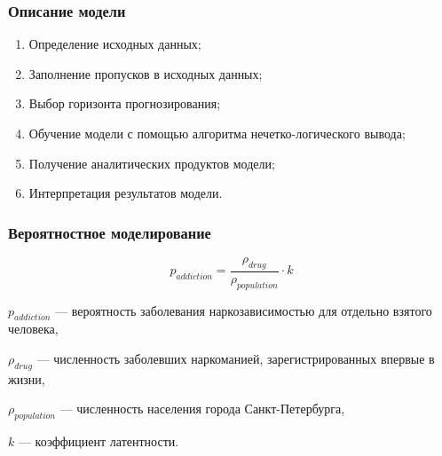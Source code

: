 \documentclass[t]{beamer}  %
\begin{document}
\begin{frame}
    \frametitle{Описание модели} 
    \begin{enumerate}
        \item Определение исходных данных;
        \item Заполнение пропусков в исходных данных;
        \item Выбор горизонта прогнозирования;
        \item Обучение модели с помощью алгоритма нечетко-логического вывода;
        \item Получение аналитических продуктов модели;
        \item Интерпретация результатов модели.
    \end{enumerate}
\end{frame}
\begin{frame}
    \frametitle{Вероятностное моделирование} 
    \begin{equation}
        p_{addiction} = \frac{\rho_{drug}}{\rho_{population}}\cdot k
    \end{equation}

    \(p_{addiction}\) --- вероятность заболевания наркозависимостью для
    отдельно взятого человека, 
    
    \(\rho_{drug}\) --- численность заболевших
    наркоманией, зарегистрированных впервые в жизни, 
    
    \(\rho_{population}\) ---
    численность населения города Санкт-Петербурга, 
    
    \(k\) --- коэффициент
    латентности.
\end{frame}
\end{document}
